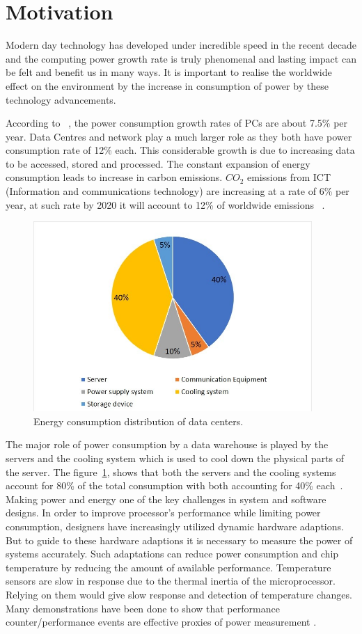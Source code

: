 \section{Motivation}
Modern day technology has developed under incredible speed in the recent decade and the computing power growth rate is truly phenomenal and lasting impact can be felt and benefit us in many ways. It is important to realise the worldwide effect on the environment by the increase in consumption of power by these technology advancements.

According to ~\cite{pickavet2008worldwide}, the power consumption growth rates of PCs are about 7.5\% per year. Data Centres and network play a much larger role as they both have power consumption rate of 12\% each. This considerable growth is due to increasing data to be accessed, stored and processed. The constant expansion of energy consumption leads to increase in carbon emissions. \(CO_2\) emissions from ICT (Information and communications technology) are increasing at a rate of 6\% per year, at such rate by 2020 it will account to 12\% of worldwide emissions ~\cite{rong2016optimizing}.

\begin{figure}[ht]
    \centering
    \includegraphics[width=300pt]{energypiechart}
    \caption{\label{fig:energypie} Energy consumption distribution of data centers.}
\end{figure}

The major role of power consumption by a data warehouse is played by the servers and the cooling system which is used to cool down the physical parts of the server. The figure~\ref{fig:energypie}, shows that both the servers and the cooling systems account for 80\% of the total consumption with both accounting for 40\% each~\cite{rong2016optimizing}. Making power and energy one of the key challenges in system and software designs. In order to improve processor's performance while limiting power consumption, designers have increasingly utilized dynamic hardware adaptions. But to guide to these hardware adaptions it is necessary to measure the power of systems accurately. Such adaptations can reduce power consumption and chip temperature by reducing the amount of available performance. Temperature sensors are slow in response due to the thermal inertia of the microprocessor. Relying on them would give slow response and detection of temperature changes. Many demonstrations have been done to show that performance counter/performance events are effective proxies of power measurement \cite{bellosa2000benefits}.


